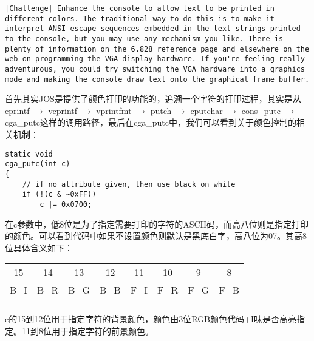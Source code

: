 \documentclass{article}
\newcommand{\funcname}[1]{{\ttfamily \small #1}}
\begin{document}
\begin{CJK*}{UTF8}{gkai}
\vspace{2em}

\begin{lstlisting}[style=challenge]
|Challenge| Enhance the console to allow text to be printed in different colors. The traditional way to do this is to make it interpret ANSI escape sequences embedded in the text strings printed to the console, but you may use any mechanism you like. There is plenty of information on the 6.828 reference page and elsewhere on the web on programming the VGA display hardware. If you're feeling really adventurous, you could try switching the VGA hardware into a graphics mode and making the console draw text onto the graphical frame buffer.
\end{lstlisting}

首先其实JOS是提供了颜色打印的功能的，追溯一个字符的打印过程，其实是从\funcname{cprintf} $\rightarrow$ \funcname{vcprintf} $\rightarrow$ \funcname{vprintfmt} $\rightarrow$ \funcname{putch} $\rightarrow$ \funcname{cputchar} $\rightarrow$ \funcname{cons\_putc} $\rightarrow$ \funcname{cga\_putc}这样的调用路径，最后在\funcname{cga\_putc}中，我们可以看到关于颜色控制的相关机制：

\begin{lstlisting}[style=ccode, firstnumber=164, title={\scriptsize \ttfamily \bfseries kern/console.c}]
static void
cga_putc(int c)
{
	// if no attribute given, then use black on white
	if (!(c & ~0xFF))
		c |= 0x0700;
\end{lstlisting}

在c参数中，低8位是为了指定需要打印的字符的ASCII码，而高八位则是指定打印的颜色。可以看到代码中如果不设置颜色则默认是黑底白字，高八位为07。其高8位具体含义如下：

\begin{table}[htp]
\centering
\makegapedcells
\setcellgapes{5pt}

\begin{tabular}{
!{\vrule width2pt} c
!{\vrule width2pt} c
!{\vrule width2pt} c
!{\vrule width2pt} c
!{\vrule width2pt} c
!{\vrule width2pt} c
!{\vrule width2pt} c
!{\vrule width2pt} c
!{\vrule width2pt}}
15 & 14 & 13 & 12 & 11 & 10 & 9 & 8 \\
\Xhline{2pt}
B\_I & B\_R & B\_G & B\_B & F\_I & F\_R & F\_G & F\_B \\
\Xhline{2pt}
\end{tabular}
\end{table}

c的15到12位用于指定字符的背景颜色，颜色由3位RGB颜色代码+I味是否高亮指定。11到8位用于指定字符的前景颜色。


\end{CJK*}
\end{document}
